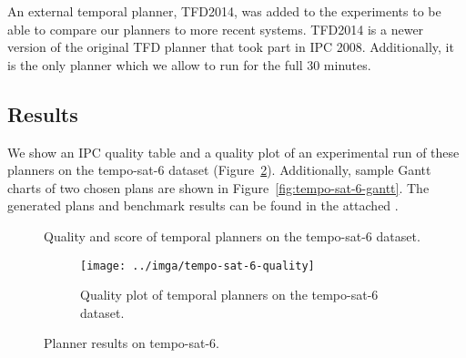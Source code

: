 An external temporal planner, TFD2014, was added to the experiments
to be able to compare our planners to more recent systems.
TFD2014 is a newer version of the original TFD planner that took part in IPC 2008. Additionally, it is the only planner which we allow to run for the full 30 minutes.

\subsection{Results}\label{temporal-results}

We show an IPC quality table and a quality plot of an experimental run of these planners on the tempo-sat-6 dataset (Figure~\ref{fig:tempo-sat-6-results}).
Additionally, sample Gantt charts \citep{Gantt1910} of two chosen plans are shown in Figure~\ref{fig:tempo-sat-6-gantt}.
The generated plans and benchmark results can be found in the attached .

\begin{figure}[tbp]
\centering
\begin{subtable}{\textwidth}
\centering
\scriptsize
\setlength{\tabcolsep}{4.6pt}
\renewcommand{\footnotesize}{\scriptsize}

\caption{Quality and score of temporal planners on the tempo-sat-6 dataset.}
\label{tab:tempo-sat-6-ipc-scores}
\end{subtable}

\vspace{0.5cm}
\begin{subfigure}{\textwidth}
\centering
\texttt{[image: ../imga/tempo-sat-6-quality]}
\caption{Quality plot of temporal planners on the tempo-sat-6 dataset.}
\label{fig:tempo-sat-6-quality}
\end{subfigure}
\caption{Planner results on tempo-sat-6.}
\label{fig:tempo-sat-6-results}
\end{figure}

